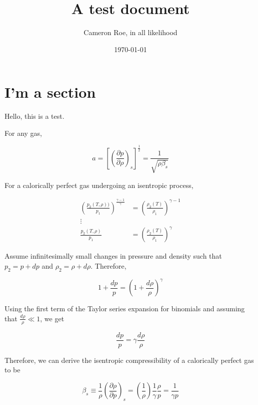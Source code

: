 \documentclass[twocolumn]{article}
\title{A test document}
\author{Cameron Roe, in all likelihood}
\date{\today}
\begin{document}
\maketitle

\section{I'm a section}
Hello, this is a test. 


For any gas, 

\begin{equation}
    a = \left[ \left(\frac{\partial p}{\partial \rho} \right)_s \right]^{\frac{1}{2}} = \frac{1}{\sqrt{\rho \beta_s}}
\end{equation}

For a calorically perfect gas undergoing an isentropic process, 

\begin{equation}
\begin{split}
    \left(\frac{p_2(T,\rho))}{p_1}\right)^\frac{\gamma - 1}{\gamma} &= \left( \frac{\rho_2(T)}{\rho_1} \right)^{\gamma - 1} \\
    \vdots& \\ 
    \frac{p_2(T,\rho)}{p_1} &= \left(\frac{\rho_2(T)}{\rho_1} \right)^\gamma
    \end{split}
\end{equation}

Assume infinitesimally small changes in pressure and density such that $p_2 = p + dp$ and $\rho_2 = \rho + d\rho$. Therefore, 

\begin{equation}
    1 + \frac{dp}{p} = \left(1 + \frac{d\rho}{\rho}\right)^\gamma
\end{equation}

Using the first term of the Taylor series expansion for binomials and assuming that $\frac{d\rho}{\rho} \ll 1$, we get

\begin{equation}
    \frac{dp}{p} = \gamma \frac{d\rho}{\rho}
\end{equation}

Therefore, we can derive the isentropic compressibility of a calorically perfect gas to be

\begin{equation}
    \beta_s \equiv \frac{1}{\rho} \left(  \frac{\partial \rho}{\partial p}\right)_s =\left( \frac{1}{\rho}\right) \frac{1}{\gamma} \frac{\rho}{p} = \frac{1}{\gamma p} \label{eq:isentropicCompressibility}
\end{equation}
\end{document}
